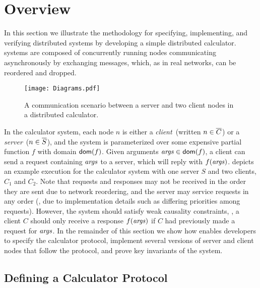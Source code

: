 

\section{Overview}
\label{sec:overview}


In this section we illustrate the \disel methodology for specifying,
implementing, and verifying distributed systems by developing a
simple distributed calculator.
%
%
\disel systems are composed of concurrently running nodes
communicating asynchronously by exchanging messages, which, as in real
networks, can be reordered and dropped.

\begin{figure}
\centering
\texttt{[image: Diagrams.pdf]}
\caption{A communication scenario between a server and two client
  nodes in a distributed calculator.}
\label{fig:calco}
\end{figure}
%
%
In the calculator system, each node $n$ is either a \emph{client}~(written $n \in
\overline{C}$) or a \emph{server}~($n \in \overline{S}$), and the system is
parameterized over some expensive partial function $f$ with domain
$\mathsf{dom}(f)$.
%
%
Given arguments $\mathit{args} \in \mathsf{dom}(f)$, a client can send a request
containing $\mathit{args}$ to a server, which will reply with $f(\mathit{args})$.
%
 depicts an example execution for the
calculator system with one server $S$ and two clients, $C_1$ and $C_2$.
%
Note that requests and responses may not be
received in the order they are sent due to network reordering, and the
server may service requests in any order (\eg, due to implementation
details such as differing priorities among requests).
%
However, the system should satisfy weak causality constraints, \eg, a
client $C$ should only receive a response $f(\mathit{args})$ if $C$ had previously
made a request for $\mathit{args}$.
%
In the remainder of this section we show how \disel enables developers
to specify the calculator protocol, implement several versions of
server and client nodes that follow the protocol, and prove key
invariants of the system.






\subsection{Defining a Calculator Protocol}
\label{sec:calc-prot}

